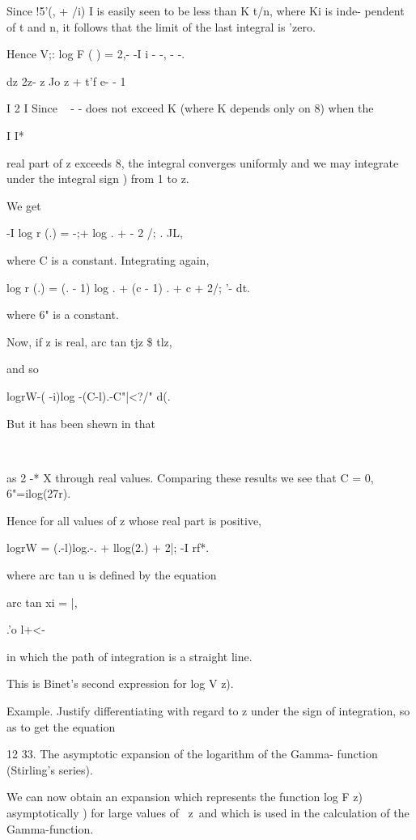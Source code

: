 Since !5'(, + /i) I is easily seen to be less than K t/n, where Ki is
inde- pendent of t and n, it follows that the limit of the last
integral is 'zero.

Hence V;: log F ( ) = 2,- -I i - -, - -.

dz 2z- z Jo z + t'f e- - 1

I 2 I Since ~ - - does not exceed K (where K depends only on 8) when
the

I I*

real part of z exceeds 8, the integral converges uniformly and we may
integrate under the integral sign ) from 1 to z.

We get

-I log r (.) = -;+ log . + - 2 /; . JL,

where C is a constant. Integrating again,

log r (.) = (. - 1) log . + (c - 1) . + c + 2/; '- dt.

where 6" is a constant.

%
%

Now, if z is real, arc tan tjz \$ tlz,

and so

logrW-( -i)log -(C-l).-C"|<?/" d(.

But it has been shewn in  that

\ \ %

as 2 -* X through real values. Comparing these results we see that C =
0, 6"=ilog(27r).

Hence for all values of z whose real part is positive,

logrW = (.-l)log.-. + llog(2.) + 2|; -I rf*.

where arc tan u is defined by the equation

arc tan xi = |,

.'o l+<-

in which the path of integration is a straight line.

This is Binet's second expression for log V z).

Example. Justify differentiating with regard to z under the sign of
integration, so as to get the equation

12 33. The asymptotic expansion of the logarithm of the Gamma-
function (Stirling's series).

We can now obtain an expansion which represents the function log F z)
asymptotically ) for large values of \ z\, and which is used in
the calculation of the Gamma-function.

